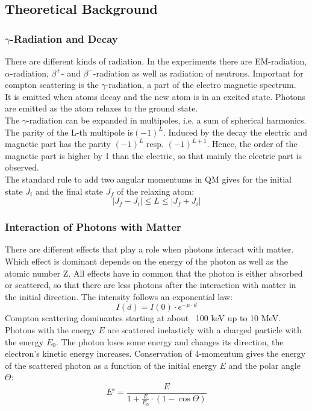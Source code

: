 \subsection{Theoretical Background}
\subsubsection{$\gamma$-Radiation and Decay}
There are different kinds of radiation. In the experiments there are EM-radiation, $\alpha$-radiation, $\beta^{+}$- and $\beta^{-}$-radiation as well as radiation of neutrons. Important for compton scattering is the  $\gamma$-radiation, a part of the electro magnetic spectrum.\\
It is emitted when atoms decay and the new atom is in an excited state. Photons are emitted as the atom relaxes to the ground state.\\
The $\gamma$-radiation can be expanded in multipoles, i.e. a sum of spherical harmonics. The parity of the L-th multipole is$(-1)^{L}$. Induced by the decay the electric and magnetic part has the parity $(-1)^{L}$ resp. $(-1)^{L+1}$. Hence, the order of the magnetic part is higher by 1 than the electric, so that mainly the electric part is observed. \\
The standard rule to add two angular momentums in QM gives for the initial state $J_i$ and the final state $J_f$ of the relaxing atom:
$$\vert J_f - J_i \vert \leq L \leq \vert J_f + J_i \vert $$ 

\subsubsection{Interaction of Photons with Matter}
There are different effects that play a role when photons interact with matter. Which effect is dominant depends on the energy of the photon as well as the atomic number Z. All effects have in common that the photon is either absorbed or scattered, so that there are less photons after the interaction with matter in the initial direction. The intensity follows an exponential law:
$$I(d) = I(0) \cdot e^{-\mu \cdot d} $$
Compton scattering dominantes starting at about ~100 keV up to 10 MeV. \\
Photons with the energy $E$ are scattered inelasticly with a charged particle with the energy $E_0$. The photon loses some energy and changes its direction, the electron's kinetic energy increases. Conservation of 4-momentum gives the energy of the scattered photon as a function of the initial energy $E$ and the polar angle $\Theta$:
$$E' = \frac{E}{1 + \frac{E}{E_0} \cdot (1 - \cos \Theta)}$$

